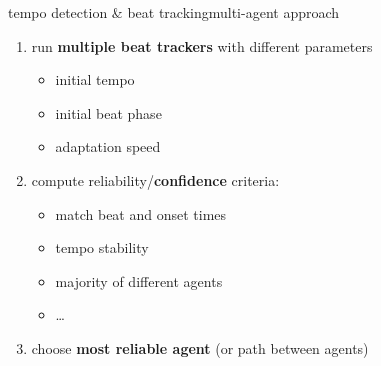         \begin{frame}{tempo detection \& beat tracking}{multi-agent approach}
            \begin{enumerate}
                \item	run \textbf{multiple beat trackers} with different parameters
                    \begin{itemize}
                        \item	initial tempo
                        \item	initial beat phase
                        \item	adaptation speed
                    \end{itemize}
                \smallskip
                \item<2->	compute reliability/\textbf{confidence} criteria:
                
                    \begin{itemize}
                        \item	match beat and onset times
                        \item<3->	tempo stability
                        \item<4->	majority of different agents
                        \item   \ldots
                    \end{itemize}
                \smallskip
                \item<5->	choose\textbf{ most reliable agent} (or path between agents)
            \end{enumerate}
        \end{frame}
        
